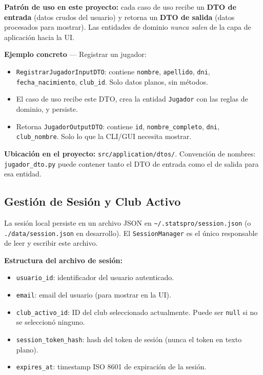 \documentclass[11pt,a4paper]{article}
\newcommand{\fpath}[1]{\texttt{\small #1}}
\begin{document}
\textbf{Patrón de uso en este proyecto:} cada caso de uso recibe un \textbf{DTO de entrada} (datos crudos del usuario) y retorna un \textbf{DTO de salida} (datos procesados para mostrar). Las entidades de dominio \textit{nunca salen} de la capa de aplicación hacia la UI.

\textbf{Ejemplo concreto} — Registrar un jugador:

\begin{itemize}[nosep]
  \item \fpath{RegistrarJugadorInputDTO}: contiene \fpath{nombre}, \fpath{apellido}, \fpath{dni}, \fpath{fecha\_nacimiento}, \fpath{club\_id}. Solo datos planos, sin métodos.
  \item El caso de uso recibe este DTO, crea la entidad \fpath{Jugador} con las reglas de dominio, y persiste.
  \item Retorna \fpath{JugadorOutputDTO}: contiene \fpath{id}, \fpath{nombre\_completo}, \fpath{dni}, \fpath{club\_nombre}. Solo lo que la CLI/GUI necesita mostrar.
\end{itemize}

\textbf{Ubicación en el proyecto:} \fpath{src/application/dtos/}. Convención de nombres: \fpath{jugador\_dto.py} puede contener tanto el DTO de entrada como el de salida para esa entidad.

\subsection{Gestión de Sesión y Club Activo}
\label{sec:sesion}

La sesión local persiste en un archivo JSON en \fpath{\textasciitilde/.statspro/session.json} (o \fpath{./data/session.json} en desarrollo). El \fpath{SessionManager} es el único responsable de leer y escribir este archivo.

\textbf{Estructura del archivo de sesión:}
\begin{itemize}[nosep]
  \item \fpath{usuario\_id}: identificador del usuario autenticado.
  \item \fpath{email}: email del usuario (para mostrar en la UI).
  \item \fpath{club\_activo\_id}: ID del club seleccionado actualmente. Puede ser \fpath{null} si no se seleccionó ninguno.
  \item \fpath{session\_token\_hash}: hash del token de sesión (nunca el token en texto plano).
  \item \fpath{expires\_at}: timestamp ISO 8601 de expiración de la sesión.
\end{itemize}
\end{document}

